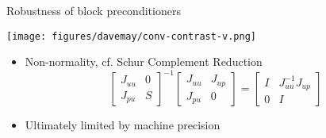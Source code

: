 \documentclass{beamer}
\begin{document}
\begin{frame}{Robustness of block preconditioners}
  \vspace{-1ex}
  \begin{center}
    \texttt{[image: figures/davemay/conv-contrast-v.png]}
  \end{center}
  \vspace{-1em}
  \begin{itemize}
  \item Non-normality, cf. Schur Complement Reduction
    \begin{equation*}
    \begin{bmatrix} J_{uu} & 0 \\ J_{pu} & S \end{bmatrix}^{-1} \begin{bmatrix} J_{uu} & J_{up} \\ J_{pu} & 0 \end{bmatrix} =
    \begin{bmatrix} I & J_{uu}^{-1} J_{up} \\ 0 & I \end{bmatrix}
  \end{equation*}
  \item Ultimately limited by machine precision
  \end{itemize}
\end{frame}
\end{document}
